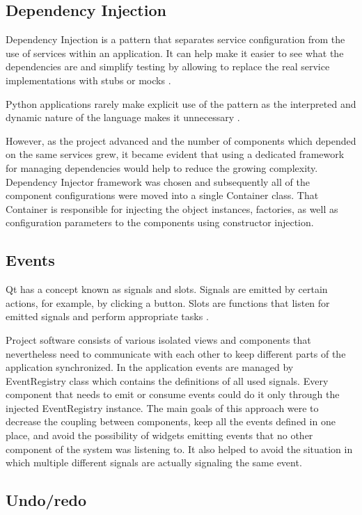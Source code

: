 \subsection{Dependency Injection}
Dependency Injection is a pattern that separates service configuration from the use of services within an application. It can help make it easier to see what the dependencies are and simplify testing by allowing to replace the real service implementations with stubs or mocks \cite{fowler-injection}.

Python applications rarely make explicit use of the pattern as the interpreted and dynamic nature of the language makes it unnecessary \cite{di-in-python}.

However, as the project advanced and the number of components which depended on the same services grew, it became evident that using a dedicated framework for managing dependencies would help to reduce the growing complexity. Dependency Injector framework was chosen and subsequently all of the component configurations were moved into a single Container class. That Container is responsible for injecting the object instances, factories, as well as configuration parameters to the components using constructor injection.

\subsection{Events}
Qt has a concept known as signals and slots. Signals are emitted by certain actions, for example, by clicking a button. Slots are functions that listen for emitted signals and perform appropriate tasks  \cite{signals-slots}.

Project software consists of various isolated views and components that nevertheless need to communicate with each other to keep different parts of the application synchronized. 
In the application events are managed by EventRegistry class which contains the definitions of all used signals. Every component that needs to emit or consume events could do it only through the injected EventRegistry instance. The main goals of this approach were to decrease the coupling between components, keep all the events defined in one place, and avoid the possibility of widgets emitting events that no other component of the system was listening to. It also helped to avoid the situation in which multiple different signals are actually signaling the same event.

\subsection{Undo/redo}

